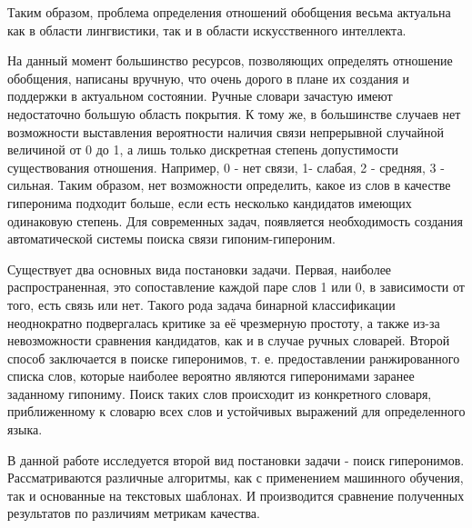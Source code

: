 Таким образом, проблема определения отношений обобщения весьма актуальна как в
области лингвистики, так и в области искусственного интеллекта.

На данный момент большинство ресурсов, позволяющих определять отношение
обобщения, написаны вручную, что очень дорого в плане их создания и поддержки в
актуальном состоянии. Ручные словари зачастую имеют недостаточно большую область
покрытия. К тому же, в большинстве случаев нет возможности выставления вероятности
наличия связи непрерывной случайной величиной от 0 до 1, а лишь только дискретная
степень допустимости существования отношения. Например, 0 - нет связи, 1- слабая, 2 -
средняя, 3 - сильная. Таким образом, нет возможности определить, какое из слов в
качестве гиперонима подходит больше, если есть несколько кандидатов имеющих
одинаковую степень. Для современных задач, появляется необходимость создания
автоматической системы поиска связи гипоним-гипероним.

Существует два основных вида постановки задачи. Первая, наиболее распространенная,
это сопоставление каждой паре слов 1 или 0, в зависимости от того, есть связь или нет.
Такого рода задача бинарной классификации неоднократно подвергалась критике за её
чрезмерную простоту, а также из-за невозможности сравнения кандидатов, как и в случае
ручных словарей. Второй способ заключается в поиске гиперонимов, т. е. предоставлении
ранжированного списка слов, которые наиболее вероятно являются гиперонимами
заранее заданному гипониму. Поиск таких слов происходит из конкретного словаря,
приближенному к словарю всех слов и устойчивых выражений для определенного языка.

В данной работе исследуется второй вид постановки задачи - поиск гиперонимов.
Рассматриваются различные алгоритмы, как с применением машинного обучения, так и
основанные на текстовых шаблонах. И производится сравнение полученных результатов
по различиям метрикам качества.





